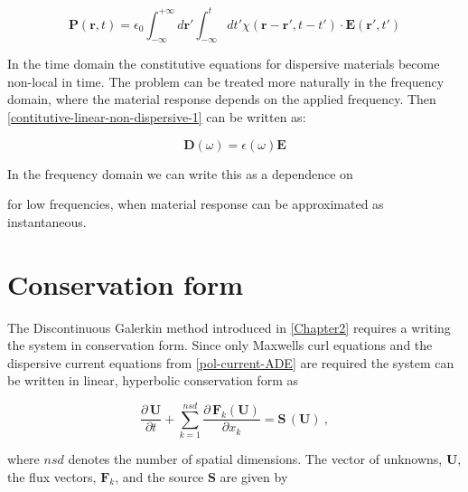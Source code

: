 \begin{equation}
\mathbf{P}(\mathbf{r},t) = \epsilon_0 \int_{-\infty}^{+\infty} d \mathbf{r}' \int_{-\infty}^{t} dt' \chi (\mathbf{r} - \mathbf{r}', t - t') \cdot \mathbf{E}(\mathbf{r}', t')
\label{dispersive-convolution-integral}
\end{equation}


In the time domain the constitutive equations for dispersive materials become non-local in time. The problem can be treated more naturally in the frequency domain, where the material response depends on the applied frequency. Then \eqref{contitutive-linear-non-dispersive-1} can be written as:

\begin{equation}
  \mathbf{D}(\omega) = \epsilon(\omega) \mathbf{E}
\end{equation}


In the frequency domain we can write this as a dependence on

 for low frequencies, when material response can be approximated as instantaneous. 

\section{Conservation form}


The Discontinuous Galerkin method introduced in \ref{Chapter2} requires a writing the system in conservation form. Since only Maxwells curl equations and the dispersive current equations from \eqref{pol-current-ADE} are required the system can be written in linear, hyperbolic conservation form as

\begin{equation}
\frac{\partial \, \mathbf{U}}{\partial t} + \sum_{k=1}^{nsd} \frac { \partial \, \mathbf{F}_k(\mathbf{U}) }{ \partial x_k } = \mathbf{S}\,(\mathbf{U}) \: ,
\label{maxwell-curl-equations-conservation-form}
\end{equation}

where $nsd$ denotes the number of spatial dimensions. The vector of unknowns, $\mathbf{U}$, the flux vectors, $\mathbf{F}_k$, and the source $\mathbf{S}$ are given by

